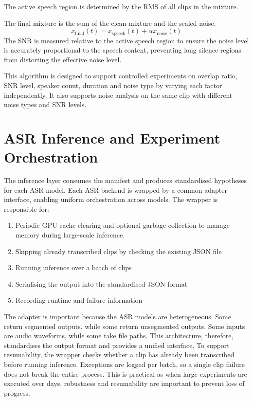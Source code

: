 The active speech region is determined by the RMS of all clips in the mixture.

The final mixture is the sum of the clean mixture and the scaled noise.
\begin{equation}
x_\mathrm{final}(t) = x_\mathrm{speech}(t)+\alpha x_\mathrm{noise}(t)
\end{equation}
The SNR is measured relative to the active speech region to ensure the noise level is accurately proportional to the speech content, preventing long silence regions from distorting the effective noise level. 

This algorithm is designed to support controlled experiments on overlap ratio, SNR level, speaker count, duration and noise type by varying each factor independently. It also supports noise analysis on the same clip with different noise types and SNR levels.




\section{ASR Inference and Experiment Orchestration}
The inference layer consumes the manifest and produces standardised hypotheses for each ASR model. Each ASR backend is wrapped by a common adapter interface, enabling uniform orchestration across models. The wrapper is responsible for:
\begin{enumerate}
    \item Periodic GPU cache clearing and optional garbage collection to manage memory during large-scale inference.
    \item Skipping already transcribed clips by checking the existing JSON file
    \item Running inference over a batch of clips
    \item Serialising the output into the standardised JSON format
    \item Recording runtime and failure information
\end{enumerate}

The adapter is important because the ASR models are heterogeneous. Some return segmented outputs, while some return unsegmented outputs. Some inputs are audio waveforms, while some take file paths. This architecture, therefore, standardises the output format and provides a unified interface.
To support resumability, the wrapper checks whether a clip has already been transcribed before running inference. Exceptions are logged per batch, so a single clip failure does not break the entire process. This is practical as when large experiments are executed over days, robustness and resumability are important to prevent loss of progress. 

